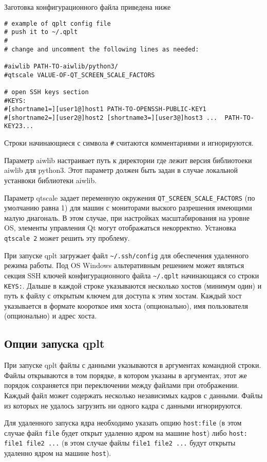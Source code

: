 \documentclass[12pt]{article}
\begin{document}
Заготовка конфигурационного файла приведена ниже
\begin{verbatim}
# example of qplt config file
# push it to ~/.qplt
#
# change and uncomment the following lines as needed:

#aiwlib PATH-TO-aiwlib/python3/
#qtscale VALUE-OF-QT_SCREEN_SCALE_FACTORS

# open SSH keys section
#KEYS:
#[shortname1=][user1@]host1 PATH-TO-OPENSSH-PUBLIC-KEY1
#[shortname2=][user2@]host2 [shortname3=][user3@]host3 ...  PATH-TO-KEY23...
\end{verbatim}

Строки начинающиеся с символа \verb'#' считаются комментариями и игнорируются. 

Параметр aiwlib настраивает путь к директории где лежит версия библиотоеки aiwlib для python3. Этот параметр должен быть задан в случае
локальной устанвоки библиотеки aiwlib.

Параметр qtscale задает переменную окружения \verb'QT_SCREEN_SCALE_FACTORS' (по умолчанию равна 1) для
машин с мониторами выского разрешения имеющими малую диагональ. В этом случае, при настройках масштабирования на уровне OS, элементы управления Qt могут отображаться некорректно. Установка \verb'qtscale 2' может решить эту проблему. 

При запуске qplt загружает файл \verb'~/.ssh/config' для обеспечения удаленного режима работы.
Под OS Windows альтеративным решением может являться секция SSH ключей конфигурационного файла \verb'~/.qplt'
начинающаяся со строки \verb'KEYS:'.
Дальше в каждой строке указываются несколько хостов (минимум один) и путь к файлу с открытым ключем для доступа к этим хостам.
Каждый хост указывается в формате коороткое имя хоста (опционально), имя пользователя (опционально) и адрес хоста.

\subsection{Опции запуска qplt}

При запуске qplt файлы с данными указываются в аргументах командной строки.
Файлы открываются в том порядке, в котором указаны в аргументах, этот же порядок сохраняется при переключении между файлами при отображении.
Каждый файл может содержать несколько независимых кадров с данными. Файлы из которых не удалось загрузить ни одного кадра с данными игнорируются.

Для удаленного запуска ядра необходимо указать опцию \verb'host:file' (в этом случае файл \verb'file'
будет открыт удаленно ядром на машине \verb'host') либо \verb'host: file1 file2 ...' (в этом случае файлы \verb'file1 file2 ...'
будут открыты удаленно ядром на машине \verb'host'). 
\end{document}
